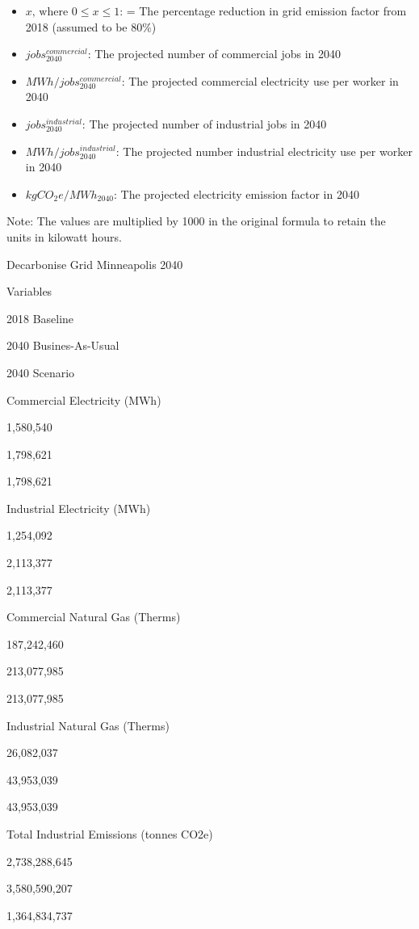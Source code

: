 \documentclass[
]{book}
\providecommand{\tightlist}{%
  \setlength{\itemsep}{0pt}\setlength{\parskip}{0pt}}
\begin{document}
\begin{itemize}
\tightlist
\item
  \(x\text{, where } 0 \le x \le 1\): = The percentage reduction in grid emission factor from 2018 (assumed to be 80\%)
\item
  \(jobs_{2040}^{commercial}\): The projected number of commercial jobs in 2040
\item
  \(MWh/jobs_{2040}^{commercial}\): The projected commercial electricity use per worker in 2040
\item
  \(jobs_{2040}^{industrial}\): The projected number of industrial jobs in 2040
\item
  \(MWh/jobs_{2040}^{industrial}\): The projected number industrial electricity use per worker in 2040
\item
  \(kgCO_2e/MWh_{2040}\): The projected electricity emission factor in 2040
\end{itemize}

Note: The values are multiplied by 1000 in the original formula to retain the units in kilowatt hours.

\label{tab:fig03b4}Decarbonise Grid Minneapolis 2040

Variables

2018 Baseline

2040 Busines-As-Usual

2040 Scenario

Commercial Electricity (MWh)

1,580,540

1,798,621

1,798,621

Industrial Electricity (MWh)

1,254,092

2,113,377

2,113,377

Commercial Natural Gas (Therms)

187,242,460

213,077,985

213,077,985

Industrial Natural Gas (Therms)

26,082,037

43,953,039

43,953,039

Total Industrial Emissions (tonnes CO2e)

2,738,288,645

3,580,590,207

1,364,834,737
\end{document}
